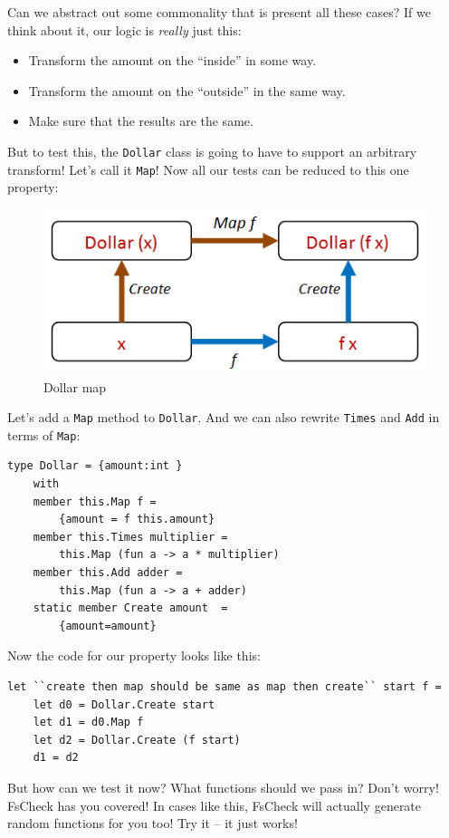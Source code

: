 Can we abstract out some commonality that is present all these cases?
If we think about it, our logic is \emph{really} just this:

\begin{itemize}
\item
  Transform the amount on the ``inside'' in some way.
\item
  Transform the amount on the ``outside'' in the same way.
\item
  Make sure that the results are the same.
\end{itemize}

But to test this, the \texttt{Dollar} class is going to have to support
an arbitrary transform! Let's call it \texttt{Map}!
Now all our tests can be reduced to this one property:

\begin{figure}[htbp]
\centering
\includegraphics{pics/property_dollar_map.png}
\caption{Dollar map}
\end{figure}

Let's add a \texttt{Map} method to \texttt{Dollar}. And we can also
rewrite \texttt{Times} and \texttt{Add} in terms of \texttt{Map}:

\begin{verbatim}
type Dollar = {amount:int } 
	with 
	member this.Map f = 
		{amount = f this.amount}
	member this.Times multiplier = 
		this.Map (fun a -> a * multiplier)
	member this.Add adder = 
		this.Map (fun a -> a + adder)
	static member Create amount  = 
		{amount=amount}
\end{verbatim}
Now the code for our property looks like this:

\begin{verbatim}
let ``create then map should be same as map then create`` start f = 
	let d0 = Dollar.Create start
	let d1 = d0.Map f  
	let d2 = Dollar.Create (f start)     
	d1 = d2
\end{verbatim}
But how can we test it now? What functions should we pass in?
Don't worry! FsCheck has you covered! In cases like this, FsCheck will
actually generate random functions for you too!
Try it -- it just works!

